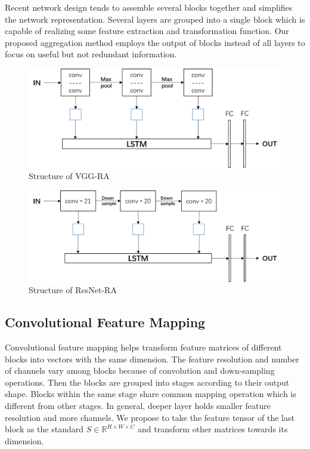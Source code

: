\documentclass[conference]{IEEEtran}
\begin{document}
Recent network design tends to assemble several blocks together and simplifies the network representation. Several layers are grouped into a single block which is capable of realizing some feature extraction and transformation function. Our proposed aggregation method employs the output of blocks instead of all layers to focus on useful but not redundant information. 

\begin{figure}  
	\centering
	\includegraphics[width=12cm]{Figures/VGG-RA.png}
	\caption{Structure of VGG-RA}
	\label{fig:VGG-RA}
\end{figure}

\begin{figure}  
	\centering
	\includegraphics[width=12cm]{Figures/ResNet-RA.png}
	\caption{Structure of ResNet-RA}
	\label{fig:ResNet-RA}
\end{figure}

\subsection{Convolutional Feature Mapping}

Convolutional feature mapping helps transform feature matrices of different blocks into vectors with the same dimension. The feature resolution and number of channels vary among blocks because of convolution and down-sampling operations. Then the blocks are grouped into stages according to their output shape. Blocks within the same stage share common mapping operation which is different from other stages. In general, deeper layer holds smaller feature resolution and more channels. We propose to take the feature tensor of the last block as the standard $S \in \mathbb{R}^{H\times W \times C}$ and transform other matrices towards its dimension. 
\end{document}
